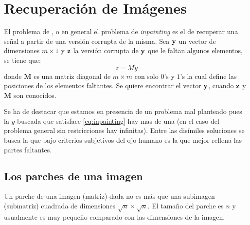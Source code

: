 \chapter{Recuperaci\'on de Imágenes}\label{chapter:ImIp} %

\begin{definition}
El problema de \II, o en general el problema de \textit{inpainting} es el de recuperar una señal a partir de una versi\'on corrupta de la misma. Sea $\mathbf{y}$ un vector de dimensiones $m \times 1$ y $\mathbf{z}$ la versi\'on corrupta de $\mathbf{y}$ que le faltan algunos elementos, se tiene que:
\begin{equation}
	z = My
	\label{eq:inpainting}
\end{equation}
donde $\mathbf{M}$ es una matriz diagonal de $m \times m$ con solo $0$'s y $1$'s la cual define las posiciones de los elementos faltantes. Se quiere encontrar el vector $\mathbf{y}$, cuando $\mathbf{z}$ y  $\mathbf{M}$ son conocidos. 
\end{definition}

Se ha de destacar que estamos en presencia de un problema mal planteado pues la $y$ buscada que satisface \ref{eq:inpainting} hay mas de una (en el caso del problema general sin restricciones hay infinitas). Entre las dis\'imiles soluciones se busca la que bajo criterios subjetivos del ojo humano es la que mejor rellena las partes faltantes. 

\section{Los parches de una imagen}\label{sec:patches}

\begin{definition}
	Un parche  de una imagen (matriz) dada no es m\'as que una subimagen (submatriz) cuadrada de dimensiones $\sqrt{n} \times \sqrt{n}$. El tamaño del parche es $n$ y usualmente es muy peque\~no comparado con las dimensiones de la imagen.
\end{definition}

